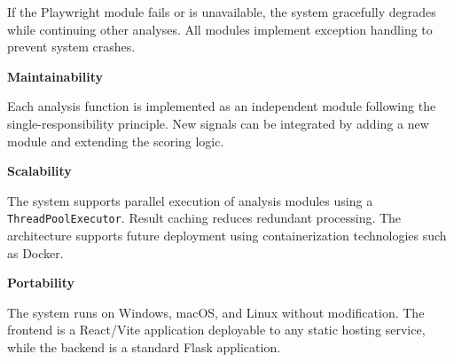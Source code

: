If the Playwright module fails or is unavailable, the system gracefully degrades while continuing other analyses. All modules implement exception handling to prevent system crashes.

\textbf{Maintainability}

Each analysis function is implemented as an independent module following the single-responsibility principle. New signals can be integrated by adding a new module and extending the scoring logic.

\textbf{Scalability}

The system supports parallel execution of analysis modules using a \texttt{ThreadPoolExecutor}. Result caching reduces redundant processing. The architecture supports future deployment using containerization technologies such as Docker.

\textbf{Portability}

The system runs on Windows, macOS, and Linux without modification. The frontend is a React/Vite application deployable to any static hosting service, while the backend is a standard Flask application.
